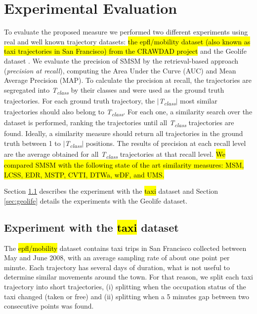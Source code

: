 \documentclass[12pt]{article}
\begin{document}
\section{Experimental Evaluation} \label{sec:experiments}
To evaluate the proposed measure we performed two different experiments using real and well known trajectory datasets: \hl{the epfl/mobility dataset (also known as taxi trajectories in San Francisco) from the CRAWDAD project} \citep{epfl-mobility-20090224} and the Geolife dataset \citep{zheng2009mining}. We evaluate the precision of SMSM by the retrieval-based approach (\textit{precision at recall}), computing the Area Under the Curve (AUC) and Mean Average Precision (MAP). To calculate the precision at recall, the trajectories are segregated into \textit{T\textsubscript{class}} by their classes and were used as the ground truth trajectories. For each ground truth trajectory, the $|$\textit{T\textsubscript{class}}$|$ most similar trajectories should also belong to \textit{T\textsubscript{class}}. For each one, a similarity search over the dataset is performed, ranking the trajectories until all \textit{T\textsubscript{class}} trajectories are found. Ideally, a similarity measure should return all trajectories in the ground truth between 1 to $|$\textit{T\textsubscript{class}}$|$ positions. The results of precision at each recall level are the average obtained for all \textit{T\textsubscript{class}} trajectories at that recall level. \hl{We compared SMSM with the following state of the art similarity measures: MSM, LCSS, EDR, MSTP, CVTI, DTWa, wDF, and UMS.}

Section \ref{sec:crawdad} describes the experiment with the \hl{taxi} dataset and Section \ref{sec:geolife} details the experiments with the Geolife dataset.

\subsection{Experiment with the \hl{taxi} dataset}\label{sec:crawdad}

The \hl{epfl/mobility} dataset contains taxi trips in San Francisco collected between May and June 2008, with an average sampling rate of about one point per minute. Each trajectory has several days of duration, what is not useful to determine similar movements around the town. For that reason, we split each taxi trajectory into short trajectories, (i) splitting when the occupation status of the taxi changed (taken or free) and (ii) splitting when a 5 minutes gap between two consecutive points was found.
\end{document}

